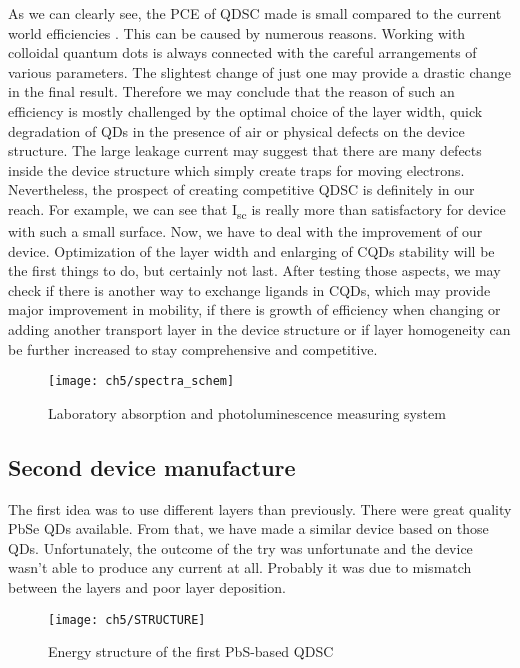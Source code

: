 As we can clearly see, the PCE of QDSC made is small compared to the
current world efficiencies \cite{Kamat2018}. This can be caused by numerous reasons.
Working with colloidal quantum dots is always connected with the careful
arrangements of various parameters. The slightest change of just one may
provide a drastic change in the final result. Therefore we may conclude
that the reason of such an efficiency is mostly challenged by the
optimal choice of the layer width, quick degradation of QDs in the
presence of air or physical defects on the device structure. The large
leakage current may suggest that there are many defects inside the
device structure which simply create traps for moving electrons.
Nevertheless, the prospect of creating competitive QDSC is definitely in
our reach. For example, we can see that I\textsubscript{sc} is really
more than satisfactory for device with such a small surface. Now, we have to deal with
the improvement of our device. Optimization of the layer width and
enlarging of CQDs stability will be the first things to do, but
certainly not last. After testing those aspects, we may check if there
is another way to exchange ligands in CQDs, which may provide major
improvement in mobility, if there is growth of efficiency when changing
or adding another transport layer in the device structure or if layer
homogeneity can be further increased to stay comprehensive and
competitive.

\begin{figure}
\centering
\texttt{[image: ch5/spectra\_schem]}
\caption{Laboratory absorption and photoluminescence measuring system }
\label{fig:pomiary}
\end{figure}
\newpage

\subsection{Second device manufacture}

The first idea was to use different layers than previously. There were great quality PbSe QDs available. From that, we have made a similar device based on those QDs. Unfortunately, the outcome of the try was unfortunate and the device wasn't able to produce any current at all. Probably it was due to mismatch between the layers and poor layer deposition. 

\begin{figure}[H]
\center
\texttt{[image: ch5/STRUCTURE]}
\caption{Energy structure of the first PbS-based QDSC}
\label{fig:1stEnergy}
\end{figure}

